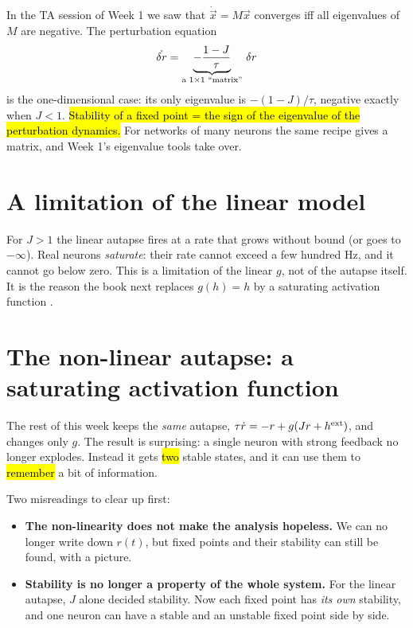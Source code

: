 In the TA session of Week 1 we saw that $\dot{\vec x} = M\vec x$ converges iff all eigenvalues of $M$ are negative. The perturbation equation
\[ \dot{\delta r} = \underbrace{-\frac{1-J}{\tau}}_{\text{a }1\times1\text{ ``matrix''}}\,\delta r \]
is the one-dimensional case: its only eigenvalue is $-(1-J)/\tau$, negative exactly when $J<1$. \hl{Stability of a fixed point = the sign of the eigenvalue of the perturbation dynamics.}
For networks of many neurons the same recipe gives a matrix, and Week 1's eigenvalue tools take over.

\section{A limitation of the linear model}

\begin{pitfall}
For $J>1$ the linear autapse fires at a rate that grows without bound (or goes to $-\infty$). Real neurons \emph{saturate}: their rate cannot exceed a few hundred Hz,
and it cannot go below zero. This is a limitation of the linear $g$, not of the autapse itself. It is the reason the book next replaces $g(h)=h$
by a saturating activation function .
\end{pitfall}

\section{The non-linear autapse: a saturating activation function}\label{sec:nonlin}

The rest of this week keeps the \emph{same} autapse, $\tau\dot r = -r + g(Jr+h^{\text{ext}})$, and changes only $g$. The result is
surprising: a single neuron with strong feedback no longer explodes. Instead it gets \hl{two} stable states, and it can use them to \hl{remember} a bit of information.

Two misreadings to clear up first:
\begin{itemize}
  \item \textbf{The non-linearity does not make the analysis hopeless.} We can no longer write down $r(t)$, but fixed points and their stability can still be found, with a picture.
  \item \textbf{Stability is no longer a property of the whole system.} For the linear autapse, $J$ alone decided stability. Now each fixed point has \emph{its own} stability, and one neuron can have a stable and an unstable fixed point side by side.
\end{itemize}

